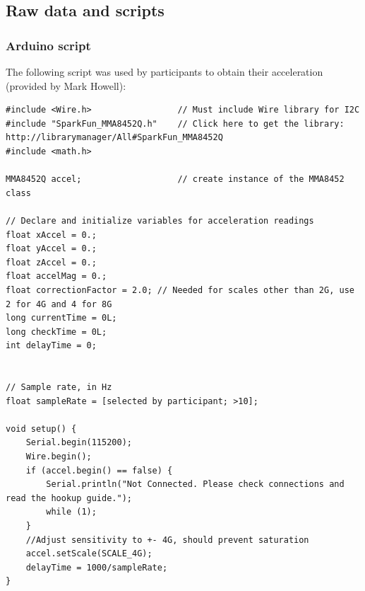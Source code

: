 \documentclass{article}
\begin{document}
\subsection{Raw data and scripts}

\subsubsection{Arduino script}

The following script was used by participants to obtain their acceleration (provided by Mark Howell):

\begin{lstlisting}
#include <Wire.h>                 // Must include Wire library for I2C
#include "SparkFun_MMA8452Q.h"    // Click here to get the library: http://librarymanager/All#SparkFun_MMA8452Q
#include <math.h>

MMA8452Q accel;                   // create instance of the MMA8452 class

// Declare and initialize variables for acceleration readings
float xAccel = 0.;
float yAccel = 0.;
float zAccel = 0.;
float accelMag = 0.;
float correctionFactor = 2.0; // Needed for scales other than 2G, use 2 for 4G and 4 for 8G
long currentTime = 0L;
long checkTime = 0L;
int delayTime = 0;


// Sample rate, in Hz
float sampleRate = [selected by participant; >10];

void setup() {
    Serial.begin(115200);
    Wire.begin();
    if (accel.begin() == false) {
        Serial.println("Not Connected. Please check connections and read the hookup guide.");
        while (1);
    }
    //Adjust sensitivity to +- 4G, should prevent saturation
    accel.setScale(SCALE_4G);
    delayTime = 1000/sampleRate;
}


\end{lstlisting}
\end{document}
